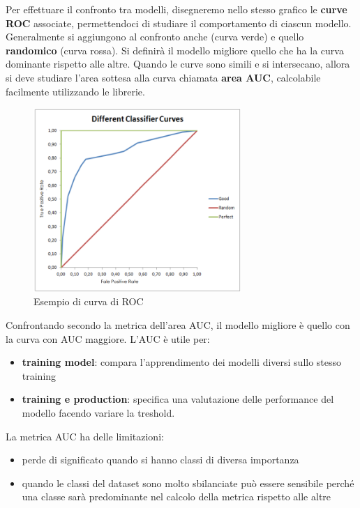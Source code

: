 Per effettuare il confronto tra modelli, disegneremo nello stesso grafico le
\textbf{curve ROC} associate, permettendoci di studiare il comportamento di ciascun
modello. Generalmente si aggiungono al confronto anche  (curva verde) e quello \textbf{randomico} (curva rossa). Si definirà
il modello migliore quello che ha la curva dominante rispetto alle altre. Quando
le curve sono simili e si intersecano, allora si deve studiare l'area sottesa
alla curva chiamata \textbf{area AUC}, calcolabile facilmente utilizzando le librerie.
\begin{figure}[!ht]
    \centering
    \includegraphics[width=0.7\textwidth]{img/performance evaluation/curva-di-ROC.png}
    \caption{Esempio di curva di ROC}
    \label{fig:curva-di-ROC}
\end{figure}
Confrontando secondo la metrica dell'area AUC, il modello
migliore è quello con la curva con AUC maggiore. L'AUC è utile per:
\begin{itemize}
    \item \textbf{training model}: compara l'apprendimento dei modelli diversi
          sullo stesso training
    \item \textbf{training e production}: specifica una valutazione delle performance
          del modello facendo variare la treshold.
\end{itemize}
La metrica AUC ha delle limitazioni:
\begin{itemize}
    \item perde di significato quando si hanno classi di diversa importanza
    \item quando le classi del dataset sono molto sbilanciate può essere sensibile
          perché una classe sarà predominante nel calcolo della metrica rispetto alle
          altre
\end{itemize}
